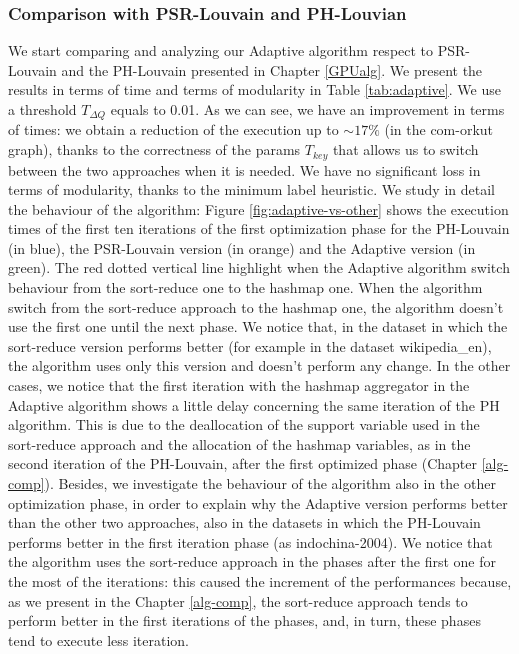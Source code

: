 \subsubsection{Comparison with PSR-Louvain and PH-Louvian}
We start comparing and analyzing our Adaptive algorithm respect to PSR-Louvain and the PH-Louvain presented in Chapter \ref{GPUalg}. We present the results in terms of time and terms of modularity in Table \ref{tab:adaptive}. We use a threshold $T_{\Delta Q}$ equals to 0.01. As we can see, we have an improvement in terms of times: we obtain a reduction  of the execution up to $\sim17\%$ (in the com-orkut graph), thanks to the correctness of the params $T_{key}$ that allows us to switch between the two approaches when it is needed. We have no significant loss in terms of modularity, thanks to the minimum label heuristic.
We study in detail the behaviour of the algorithm: Figure \ref{fig:adaptive-vs-other} shows the execution times of the first ten iterations of the first optimization phase for the PH-Louvain (in blue), the PSR-Louvain version (in orange) and the Adaptive version (in green). The red dotted vertical line highlight when the Adaptive algorithm switch behaviour from the sort-reduce one to the hashmap one. When the algorithm switch from the sort-reduce approach to the hashmap one, the algorithm doesn't use the first one until the next phase. We notice that, in the dataset in which the sort-reduce version performs better (for example in the dataset wikipedia\_en), the algorithm uses only this version and doesn't perform any change. In the other cases, we notice that the first iteration with the hashmap aggregator in the Adaptive algorithm shows a little delay concerning the same iteration of the PH algorithm. This is due to the deallocation of the support variable used in the sort-reduce approach and the allocation of the hashmap variables, as in the second iteration of the PH-Louvain, after the first optimized phase (Chapter \ref{alg-comp}). Besides, we investigate the behaviour of the algorithm also in the other optimization phase, in order to explain why the Adaptive version performs better than the other two approaches, also in the datasets in which the PH-Louvain performs better in the first iteration phase (as indochina-2004). We notice that the algorithm uses the sort-reduce approach in the phases after the first one for the most of the iterations: this caused the increment of the performances because, as we present in the Chapter \ref{alg-comp},  the sort-reduce approach tends to perform better in the first iterations of the phases, and, in turn, these phases tend to execute less iteration.
\newpage
